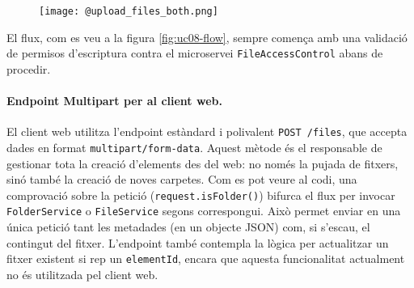 \begin{figure}[H]
    \centering
    \texttt{[image: @upload\_files\_both.png]}
\end{figure}

El flux, com es veu a la figura \ref{fig:uc08-flow}, sempre comença amb una validació de permisos d'escriptura contra el microservei \texttt{FileAccessControl} abans de procedir.

\paragraph{Endpoint Multipart per al client web.} El client web utilitza l'endpoint estàndard i polivalent \texttt{POST /files}, que accepta dades en format \texttt{multipart/form-data}. Aquest mètode és el responsable de gestionar tota la creació d'elements des del web: no només la pujada de fitxers, sinó també la creació de noves carpetes. Com es pot veure al codi, una comprovació sobre la petició (\texttt{request.isFolder()}) bifurca el flux per invocar \texttt{FolderService} o \texttt{FileService} segons correspongui. Això permet enviar en una única petició tant les metadades (en un objecte JSON) com, si s'escau, el contingut del fitxer. L'endpoint també contempla la lògica per actualitzar un fitxer existent si rep un \texttt{elementId}, encara que aquesta funcionalitat actualment no és utilitzada pel client web.

